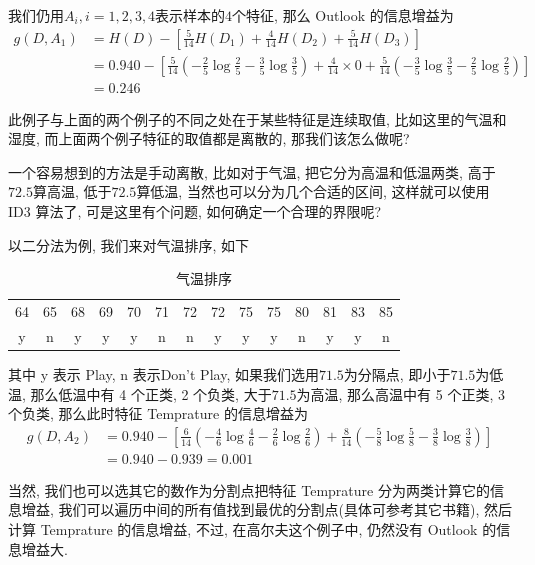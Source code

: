 \documentclass[a4paper,UTF8]{ctexart}
\theoremstyle{plain} \newtheorem{theorem}{定理}[section]
\theoremstyle{plain} \newtheorem{definition}{定义}[section]
\theoremstyle{plain} \newtheorem{lemma}{引理}[section]
\theoremstyle{plain} \newtheorem{proposition}{命题}[section]
\theoremstyle{plain} \newtheorem{example}{例}
\theoremstyle{plain} \newtheorem{remark}{注}
\theoremstyle{plain} \newtheorem{corollary}{推论}[section]
\begin{document}
我们仍用$A_i, i = 1, 2, 3, 4$表示样本的$4$个特征, 那么 Outlook 的信息增益为
\begin{align*}
g(D, A_{1}) & = H(D) - \left[ \frac{5}{14} H(D_{1}) + \frac{4}{14} H(D_{2}) + \frac{5}{14} H(D_{3}) \right] \\ 
& = 0.940 - \left[ \frac{5}{14} \left( - \frac{2}{5} \log \frac{2}{5} - \frac{3}{5} \log \frac{3}{5} \right) + \frac{4}{14} \times 0 + \frac{5}{14} \left( - \frac{3}{5} \log \frac{3}{5} - \frac{2}{5} \log \frac{2}{5} \right) \right] \\ 
& = 0.246
\end{align*}

此例子与上面的两个例子的不同之处在于某些特征是连续取值, 比如这里的气温和湿度, 而上面两个例子特征的取值都是离散的, 那我们该怎么做呢?

一个容易想到的方法是手动离散, 比如对于气温, 把它分为高温和低温两类, 高于$72.5$算高温, 低于$72.5$算低温, 当然也可以分为几个合适的区间, 这样就可以使用 ID3 算法了, 可是这里有个问题, 如何确定一个合理的界限呢?

以二分法为例, 我们来对气温排序, 如下
\begin{table}[!htb]
\centering
\caption{气温排序}
\label{temp}
\begin{tabular}{cccccccccccccc}
    \hline
    64 & 65 & 68 & 69 & 70 & 71 & 72 & 72 & 75 & 75 & 80 & 81 & 83 & 85 \\ 
    y  & n  & y  & y  & y  & n  & n  & y  & y  & y  & n  & y  & y  & n \\
    \hline
\end{tabular}
\end{table}

其中 y 表示 Play, n 表示Don't Play, 如果我们选用$71.5$为分隔点, 即小于$71.5$为低温, 那么低温中有 4 个正类, 2 个负类, 大于$71.5$为高温, 那么高温中有 5 个正类, 3 个负类, 那么此时特征 Temprature 的信息增益为
\begin{align*}
g(D, A_{2}) & = 0.940 - \left[ \frac{6}{14} \left( - \frac{4}{6} \log \frac{4}{6} - \frac{2}{6} \log \frac{2}{6} \right) + \frac{8}{14} \left( - \frac{5}{8} \log \frac{5}{8} - \frac{3}{8} \log \frac{3}{8} \right) \right] \\ 
& = 0.940 - 0.939 = 0.001
\end{align*}

当然, 我们也可以选其它的数作为分割点把特征 Temprature 分为两类计算它的信息增益, 我们可以遍历中间的所有值找到最优的分割点(具体可参考其它书籍), 然后计算 Temprature 的信息增益, 不过, 在高尔夫这个例子中, 仍然没有 Outlook 的信息增益大.
\end{document}

